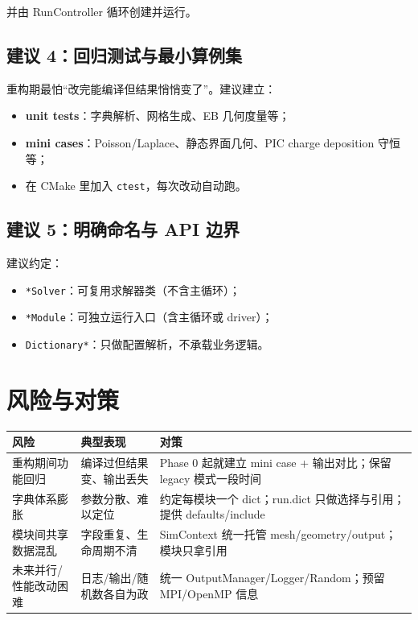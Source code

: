 \documentclass[UTF8,a4paper,11pt]{ctexart}
\begin{document}
并由 RunController 循环创建并运行。

\subsection{建议 4：回归测试与最小算例集}
重构期最怕“改完能编译但结果悄悄变了”。建议建立：
\begin{itemize}
  \item \textbf{unit tests}：字典解析、网格生成、EB 几何度量等；
  \item \textbf{mini cases}：Poisson/Laplace、静态界面几何、PIC charge deposition 守恒等；
  \item 在 CMake 里加入 \texttt{ctest}，每次改动自动跑。
\end{itemize}

\subsection{建议 5：明确命名与 API 边界}
建议约定：
\begin{itemize}
  \item \texttt{*Solver}：可复用求解器类（不含主循环）；
  \item \texttt{*Module}：可独立运行入口（含主循环或 driver）；
  \item \texttt{Dictionary*}：只做配置解析，不承载业务逻辑。
\end{itemize}

\section{风险与对策}

\begin{longtable}{p{}p{}p{}}
\toprule
风险 & 典型表现 & 对策\\
\midrule
重构期间功能回归 & 编译过但结果变、输出丢失 & Phase 0 起就建立 mini case + 输出对比；保留 legacy 模式一段时间\\
字典体系膨胀 & 参数分散、难以定位 & 约定每模块一个 dict；run.dict 只做选择与引用；提供 defaults/include\\
模块间共享数据混乱 & 字段重复、生命周期不清 & SimContext 统一托管 mesh/geometry/output；模块只拿引用\\
未来并行/性能改动困难 & 日志/输出/随机数各自为政 & 统一 OutputManager/Logger/Random；预留 MPI/OpenMP 信息\\
\bottomrule
\end{longtable}
\end{document}
